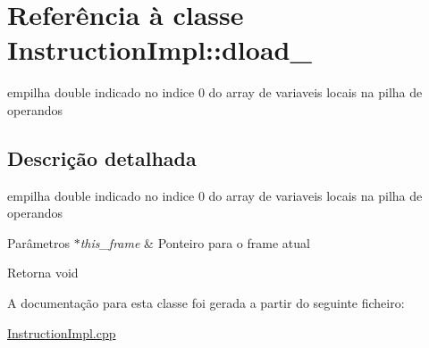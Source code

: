 \hypertarget{class_instruction_impl_1_1dload__0}{}\section{Referência à classe Instruction\+Impl\+:\+:dload\+\_}
\label{class_instruction_impl_1_1dload__0}


empilha double indicado no indice 0 do array de variaveis locais na pilha de operandos  




\subsection{Descrição detalhada}
empilha double indicado no indice 0 do array de variaveis locais na pilha de operandos 


\begin{DoxyParams}{Parâmetros}
{\em $\ast$this\+\_\+frame} & Ponteiro para o frame atual \\
\hline
\end{DoxyParams}
\begin{DoxyReturn}{Retorna}
void 
\end{DoxyReturn}


A documentação para esta classe foi gerada a partir do seguinte ficheiro\+:\begin{DoxyCompactItemize}
\item 
\hyperlink{_instruction_impl_8cpp}{Instruction\+Impl.\+cpp}\end{DoxyCompactItemize}

